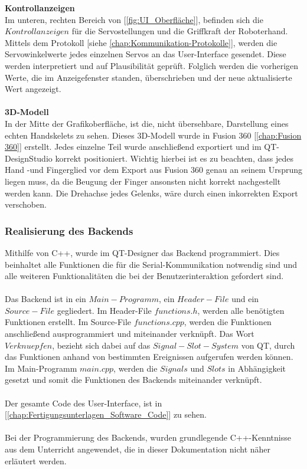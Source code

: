 \documentclass[titlepage,12pt,twoside]{article}
\begin{document}
\textbf{Kontrollanzeigen} \\ 
Im unteren, rechten Bereich von [\textcolor{blue}{\autoref{fig:UI_Oberfläche}}], befinden sich die $Kontrollanzeigen$ für die Servostellungen und die Griffkraft der Roboterhand. Mittels dem Protokoll [siehe \textcolor{blue}{\autoref{chap:Kommunikation-Protokolle}}], werden
die Servowinkelwerte jedes einzelnen Servos an das User-Interface gesendet. Diese werden interpretiert und auf Plausibilität geprüft. Folglich werden die vorherigen Werte, die im Anzeigefenster standen, überschrieben und der neue aktualisierte Wert angezeigt. \\
\\
\textbf{3D-Modell} \\
In der Mitte der Grafikoberfläche, ist die, nicht übersehbare, Darstellung eines echten Handskelets zu sehen. Dieses 3D-Modell wurde in Fusion 360 [\textcolor{blue}{\autoref{chap:Fusion 360}}] erstellt. Jedes einzelne Teil wurde anschließend exportiert und im QT-DesignStudio korrekt positioniert. Wichtig
hierbei ist es zu beachten, dass jedes Hand -und Fingerglied vor dem Export aus Fusion 360 genau an seinem Ursprung liegen muss, da die Beugung der Finger ansonsten nicht korrekt nachgestellt werden kann. Die Drehachse jedes Gelenks, wäre durch einen inkorrekten Export
verschoben.  

\subsubsection{Realisierung des Backends}
Mithilfe von C++, wurde im QT-Designer das Backend programmiert. Dies beinhaltet alle Funktionen die für die Serial-Kommunikation notwendig sind und alle weiteren Funktionalitäten die bei der Benutzerinteraktion gefordert sind. \\
\\
Das Backend ist in ein $Main-Programm$, ein $Header-File$ und ein $Source-File$ gegliedert. Im Header-File $functions.h$, werden alle benötigten Funktionen erstellt. Im Source-File $functions.cpp$, werden die Funktionen anschließend 
ausprogrammiert und miteinander verknüpft. Das Wort $Verknuepfen$, bezieht sich dabei auf das $Signal-Slot-System$ von QT, durch das Funktionen anhand von bestimmten Ereignissen aufgerufen werden können. Im Main-Programm $main.cpp$, werden die $Signals$
und $Slots$ in Abhängigkeit gesetzt und somit die Funktionen des Backends miteinander verknüpft. \\
\\
Der gesamte Code des User-Interface, ist in [\textcolor{blue}{\autoref{chap:Fertigungsunterlagen_Software_Code}}] zu sehen. \\
\\
Bei der Programmierung des Backends, wurden grundlegende C++-Kenntnisse aus dem Unterricht angewendet, die in dieser Dokumentation nicht näher erläutert werden. \\
\\
\end{document}
